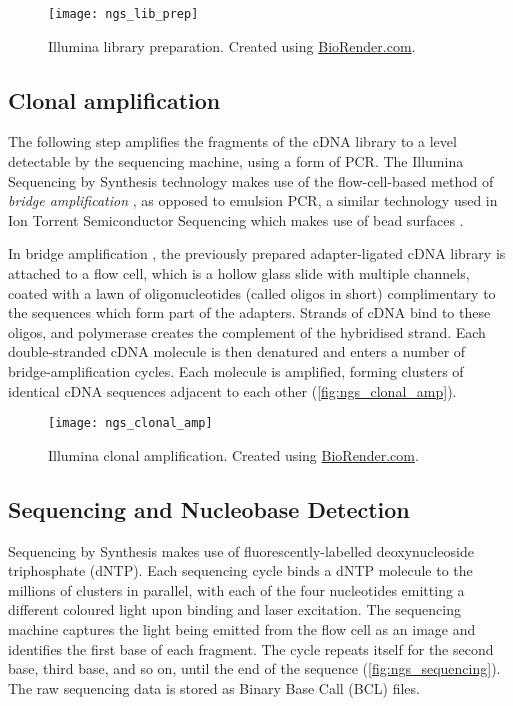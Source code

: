
\begin{figure}[!ht]
    \centering
    \texttt{[image: ngs\_lib\_prep]}
    \caption[Library preparation]{Illumina library preparation. Created using \href{https://biorender.com/}{BioRender.com}. } 
    \label{fig:ngs_lib_prep}
\end{figure}
\clearpage

\subsection{Clonal amplification}
The following step amplifies the fragments of the cDNA library to a level detectable by the sequencing machine, using a form of \ac{PCR}. The Illumina Sequencing by Synthesis technology makes use of the flow-cell-based method of \textit{bridge amplification} \citep{illumina2010}, as opposed to emulsion PCR, a similar technology used in Ion Torrent Semiconductor Sequencing which makes use of bead surfaces \citep{williams2006amplification}.

In bridge amplification \citep{illumina2010}, the previously prepared adapter-ligated cDNA library is attached to a flow cell, which is a hollow glass slide with multiple channels, coated with a lawn of oligonucleotides (called oligos in short) complimentary to the sequences which form part of the adapters. Strands of cDNA bind to these oligos, and polymerase creates the complement of the hybridised strand. Each double-stranded cDNA molecule is then denatured and enters a number of bridge-amplification cycles. Each molecule is amplified, forming clusters of identical cDNA sequences adjacent to each other (\autoref{fig:ngs_clonal_amp}).

\begin{figure}[!ht]
    \centering
    \texttt{[image: ngs\_clonal\_amp]}
    \caption[Illumina clonal amplification]{Illumina clonal amplification. Created using \href{https://biorender.com/}{BioRender.com}. } 
    \label{fig:ngs_clonal_amp}
\end{figure}
\clearpage

\subsection{Sequencing and Nucleobase Detection}
Sequencing by Synthesis \citep{illumina2010} makes use of fluorescently-labelled deoxynucleoside triphosphate (dNTP). Each sequencing cycle binds a dNTP molecule to the millions of clusters in parallel, with each of the four nucleotides emitting a different coloured light upon binding and laser excitation. The sequencing machine captures the light being emitted from the flow cell as an image and identifies the first base of each fragment. The cycle repeats itself for the second base, third base, and so on, until the end of the sequence (\autoref{fig:ngs_sequencing}). The raw sequencing data is stored as Binary Base Call (BCL) files.


